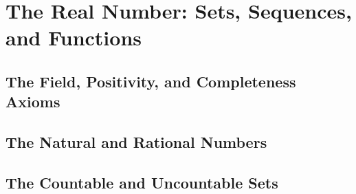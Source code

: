 \section{The Real Number: Sets, Sequences, and Functions}

\subsection{The Field, Positivity, and Completeness Axioms}


\subsection{The Natural and Rational Numbers}


\subsection{The Countable and Uncountable Sets}

